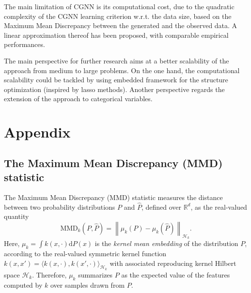 \documentclass[a4paper, 11pt]{article}
\begin{document}
The main limitation of CGNN is its computational cost, due to the quadratic complexity of the CGNN learning criterion w.r.t. the data size, based on the Maximum Mean Discrepancy between the generated and the observed data. A linear approximation thereof has been proposed, with comparable empirical performances.

The main perspective for further research aims at a better scalability of the approach from medium to large problems. On the one hand, the computational scalability could be tackled by using embedded framework for the structure optimization (inspired by lasso methods). Another perspective regards the extension of the approach to categorical variables.






\clearpage
\newpage

\section{Appendix}



\subsection{The Maximum Mean Discrepancy (MMD) statistic}
\label{app:mmd}

The Maximum Mean Discrepancy (MMD) statistic \citep{gretton2007kernel}
measures the distance between two probability distributions $P$ and $\hat{P}$,
defined over $\mathbb{R}^d$, as the real-valued quantity
\begin{equation*}
    \text{MMD}_k(P, \hat{P}) = \left\| \mu_k(P) - \mu_k(\hat{P})
    \right\|_{\mathcal{H}_k}.
\end{equation*}
Here, $\mu_k = \int k(x, \cdot) \mathrm{d} P(x)$ is the \emph{kernel mean
embedding} of the distribution $P$, according to the real-valued symmetric
kernel function $k(x, x') = \langle k(x, \cdot), k(x', \cdot)
\rangle_{\mathcal{H}_k}$ with associated reproducing kernel Hilbert space
$\mathcal{H}_k$.  Therefore, $\mu_k$ summarizes $P$ as the expected value of
the features computed by $k$ over samples drawn from $P$. 
\end{document}
